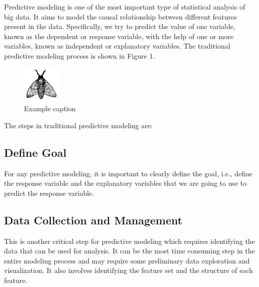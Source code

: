 \documentclass[sigconf]{acmart}
\begin{document}
Predictive modeling is one of the most important type of statistical analysis of big data. It aims to model the causal relationship between different features present in the data. Specifically, we try to predict the value of one variable, known as the dependent or response variable, with the help of one or more variables, known as independent or explanatory variables. The traditional predictive modeling process is shown in Figure 1.

\begin{figure}[!ht]
  \centering\includegraphics[width=\columnwidth]{images/fly.pdf}
  \caption{Example caption}\label{f:fly}
\end{figure}

The steps in traditional predictive modeling are: \cite{part-reg}

\subsection{Define Goal}
For any predictive modeling, it is important to clearly define the goal, i.e., define the response variable and the explanatory variables that we are going to use to predict the response variable.
\subsection{Data Collection and Management} 
This is another critical step for predictive modeling which requires identifying the data that can be used for analysis. It can be the most time consuming step in the entire modeling process and may require some preliminary data exploration and visualization. It also involves identifying the feature set and the structure of each feature.
\end{document}
